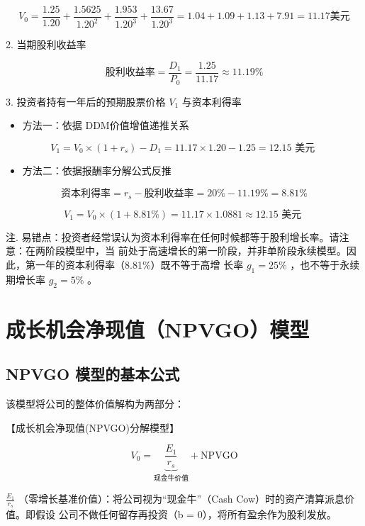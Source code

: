 \documentclass[lang=cn,10pt,color=blue]{elegantbook}
\begin{document}
$$
V _ {0} = \frac {1 . 2 5}{1 . 2 0} + \frac {1 . 5 6 2 5}{1 . 2 0 ^ {2}} + \frac {1 . 9 5 3}{1 . 2 0 ^ {3}} + \frac {1 3 . 6 7}{1 . 2 0 ^ {3}} = 1. 0 4 + 1. 0 9 + 1. 1 3 + 7. 9 1 = 1 1. 1 7 \text {美元}
$$

2. 当期股利收益率 

$$
\text{股利收益率} = \frac {D _ {1}}{P _ {0}} = \frac {1 . 2 5}{1 1 . 1 7} \approx 1 1. 1 9 \%
$$

3. 投资者持有一年后的预期股票价格 $V _ { 1 }$ 与资本利得率 

\begin{itemize}
  \item 方法一：依据 DDM价值增值递推关系
\end{itemize}

$$
V _ {1} = V _ {0} \times (1 + r _ {s}) - D _ {1} = 1 1. 1 7 \times 1. 2 0 - 1. 2 5 = 1 2. 1 5 \text { 美元 }
$$

\begin{itemize}
  \item 方法二：依据报酬率分解公式反推
\end{itemize}

$$
\text{资本利得率} = r _ {s} - \text{股利收益率} = 20 \% - 11.19 \% = 8.81 \%
$$

$$
V _ {1} = V _ {0} \times (1 + 8. 8 1 \%) = 1 1. 1 7 \times 1. 0 8 8 1 \approx 1 2. 1 5 \text { 美元 }
$$

注. 易错点：投资者经常误认为资本利得率在任何时候都等于股利增长率。请注意：在两阶段模型中，当 前处于高速增长的第一阶段，并非单阶段永续模型。因此，第一年的资本利得率（8.81\%）既不等于高增 长率 $g _ { 1 } = 2 5 \%$ ，也不等于永续期增长率 $g _ { 2 } = 5 \%$ 。 

\section{成长机会净现值（NPVGO）模型}

\subsection{NPVGO 模型的基本公式}

该模型将公司的整体价值解构为两部分： 

【成长机会净现值(NPVGO)分解模型】 

$$
\boxed {V _ {0} = \underbrace {\frac {E _ {1}}{r _ {s}}} _ {\text {现金牛价值}} + \mathrm {N P V G O}}
$$

$\frac { E _ { 1 } } { r _ { s } }$ （零增长基准价值）：将公司视为“现金牛”（Cash Cow）时的资产清算派息价值。即假设 公司不做任何留存再投资（b = 0），将所有盈余作为股利发放。 
\end{document}
